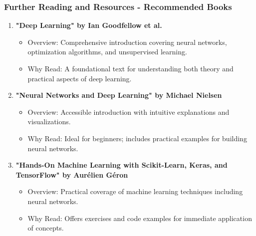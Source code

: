 \documentclass[aspectratio=169]{beamer}
\begin{document}
\begin{frame}[fragile]
    \frametitle{Further Reading and Resources - Recommended Books}
    \begin{enumerate}
        \item \textbf{"Deep Learning" by Ian Goodfellow et al.}
        \begin{itemize}
            \item Overview: Comprehensive introduction covering neural networks, optimization algorithms, and unsupervised learning.
            \item Why Read: A foundational text for understanding both theory and practical aspects of deep learning.
        \end{itemize}
        
        \item \textbf{"Neural Networks and Deep Learning" by Michael Nielsen}
        \begin{itemize}
            \item Overview: Accessible introduction with intuitive explanations and visualizations.
            \item Why Read: Ideal for beginners; includes practical examples for building neural networks.
        \end{itemize}
        
        \item \textbf{"Hands-On Machine Learning with Scikit-Learn, Keras, and TensorFlow" by Aurélien Géron}
        \begin{itemize}
            \item Overview: Practical coverage of machine learning techniques including neural networks.
            \item Why Read: Offers exercises and code examples for immediate application of concepts.
        \end{itemize}
    \end{enumerate}
\end{frame}
\end{document}
